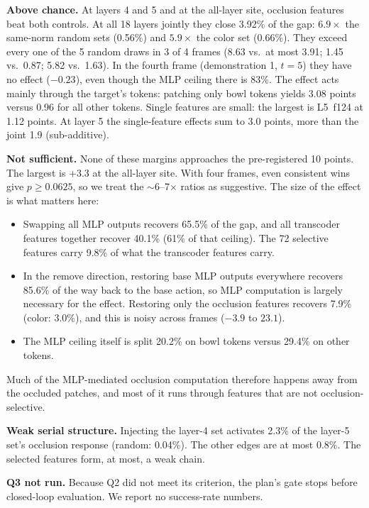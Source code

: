 \documentclass{article} %
\begin{document}
\textbf{Above chance.} At layers 4 and 5 and at the all-layer site, occlusion features beat both controls. At all 18 layers jointly they close 3.92\% of the gap: $6.9\times$ the same-norm random sets (0.56\%) and $5.9\times$ the color set (0.66\%). They exceed every one of the 5 random draws in 3 of 4 frames (8.63 vs.\ at most 3.91; 1.45 vs.\ 0.87; 5.82 vs.\ 1.63). In the fourth frame (demonstration 1, $t{=}5$) they have no effect ($-0.23$), even though the MLP ceiling there is 83\%. The effect acts mainly through the target's tokens: patching only bowl tokens yields 3.08 points versus 0.96 for all other tokens. Single features are small: the largest is L5~f124 at 1.12 points. At layer 5 the single-feature effects sum to 3.0 points, more than the joint 1.9 (sub-additive).

\textbf{Not sufficient.} None of these margins approaches the pre-registered 10 points. The largest is $+3.3$ at the all-layer site. With four frames, even consistent wins give $p\ge0.0625$, so we treat the $\sim$6--7$\times$ ratios as suggestive. The size of the effect is what matters here:
\begin{itemize}[leftmargin=*,itemsep=0pt,topsep=1pt]
  \item Swapping all MLP outputs recovers 65.5\% of the gap, and all transcoder features together recover 40.1\% (61\% of that ceiling). The 72 selective features carry 9.8\% of what the transcoder features carry.
  \item In the remove direction, restoring base MLP outputs everywhere recovers 85.6\% of the way back to the base action, so MLP computation is largely necessary for the effect. Restoring only the occlusion features recovers 7.9\% (color: 3.0\%), and this is noisy across frames ($-3.9$ to $23.1$).
  \item The MLP ceiling itself is split 20.2\% on bowl tokens versus 29.4\% on other tokens.
\end{itemize}
Much of the MLP-mediated occlusion computation therefore happens away from the occluded patches, and most of it runs through features that are not occlusion-selective.

\textbf{Weak serial structure.} Injecting the layer-4 set activates 2.3\% of the layer-5 set's occlusion response (random: 0.04\%). The other edges are at most 0.8\%. The selected features form, at most, a weak chain.

\textbf{Q3 not run.} Because Q2 did not meet its criterion, the plan's gate stops before closed-loop evaluation. We report no success-rate numbers.
\end{document}
